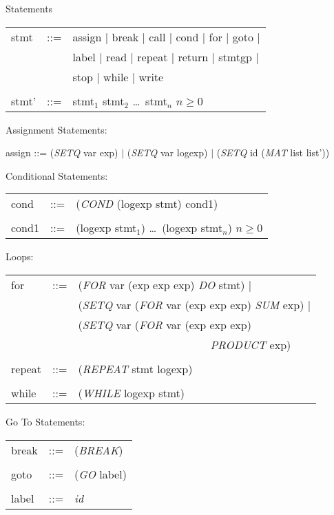 \begin{describe}{Statements}
\begin{tabular}{lll}
stmt & ::= &  assign  $\mid$  break  $\mid$  call  $\mid$  cond  $\mid$
for  $\mid$  goto $\mid$\\
& & label  $\mid$  read  $\mid$  repeat  $\mid$  return  $\mid$  stmtgp
$\mid$\\
& & stop  $\mid$  while  $\mid$  write \\
& &\\
stmt' &  ::= & stmt$_1$ stmt$_2$ \dots\  stmt$_n$   $n \geq 0$\\
\end{tabular}

Assignment Statements:

assign  ::=  ({\it SETQ\/} var exp)  $\mid$  ({\it SETQ\/} var logexp) $\mid$
             ({\it SETQ\/} id ({\it MAT\/} list list'))

Conditional Statements:

\begin{tabular}{lll}
cond & ::= & ({\it COND\/} (logexp stmt) cond1) \\
& & \\
cond1 & ::= & (logexp stmt$_1$) \dots\  (logexp stmt$_n$) $n \geq 0$\\
\end{tabular}

Loops:

\begin{tabular}{lll}
for & ::= & ({\it FOR\/} var (exp exp exp) {\it DO\/} stmt) $\mid$\\
& &  ({\it SETQ\/} var ({\it FOR\/} var (exp exp exp) {\it SUM\/} exp) $\mid$\\
& & ({\it SETQ\/} var ({\it FOR\/} var (exp exp exp) \\
& & \ \ \ \ \ \ \ \ \ \ \ \ \ \ \ \ \ \ \ \ \ \ \ \ {\it PRODUCT\/} exp)\\
& &\\
repeat & ::= & ({\it REPEAT\/} stmt logexp)\\
& &\\
while & ::= & ({\it WHILE\/} logexp stmt)
\end{tabular}

Go To Statements:

\begin{tabular}{lll}
break & ::= & ({\it BREAK\/})\\
& & \\
goto & ::= & ({\it GO\/} label)\\
& & \\
label & ::= & {\it id}\\
\end{tabular}


\end{describe}
